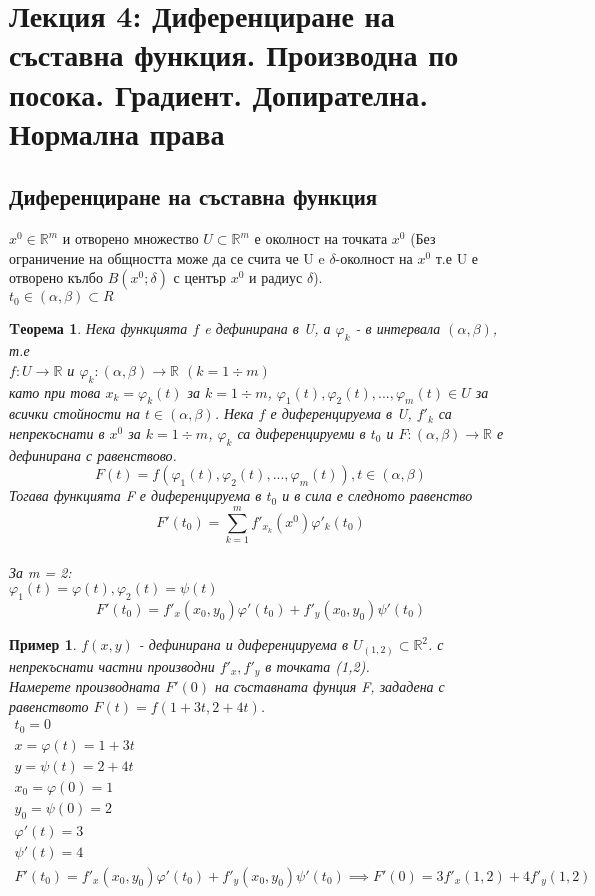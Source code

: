 \documentclass[a4paper,fleqn,12pt]{article}
\newtheorem{theorem}{Tеорема}[subsection]
\newtheorem{example}{Пример}[subsection]
\begin{document}
\newpage

\section{Лекция 4: Диференциране на съставна функция. Производна по посока. Градиент. Допирателна. Нормална права}

\subsection{Диференциране на съставна функция}
$x^0 \in \mathbb{R}^m$ и отворено множество $U \subset \mathbb{R}^m$ е околност на точката $x^0$ (Без ограничение на общността може да се счита че U e $\delta$-околност на $x^0$ т.е U е отворено кълбо $B(x^0;\delta)$ с център $x^0$ и радиус $\delta$). \\
$t_0 \in (\alpha, \beta) \subset R$

\begin{theorem}
Нека функцията $f$ e дефинирана в U, а $\varphi_k$ - в интервала $(\alpha, \beta)$, т.е \\
$f: U \to \mathbb{R}$ и $\varphi_k: (\alpha, \beta)  \to \mathbb{R} $ $ (k = 1 \div m)$\\
като при това $x_k = \varphi_k(t)$ за $ k = 1 \div m $, $ \varphi_1(t),  \varphi_2(t), ...,  \varphi_m(t) \in U$ за всички стойности на $t \in (\alpha, \beta)$. Нека $f$ е диференцируема в U, $f'_k$ са непрекъснати в $x^0$ за $ k = 1 \div m$, $\varphi_k$ са диференцируеми в $t_0$ и $F: (\alpha, \beta)  \to \mathbb{R}$ е дефинирана с равенствово. \\
$$F(t) = f(\varphi_1(t),  \varphi_2(t), ...,  \varphi_m(t)), t \in (\alpha, \beta)$$
Тогава функцията F е диференцируема в $t_0$ и в сила е следното равенство
$$F'(t_0) = \sum_{k =1}^m f'_{x_k}(x^0)\varphi '_k (t_0)$$ \\
За m = 2: \\
$\varphi_1(t) = \varphi(t) , \varphi_2(t) =\psi(t) $
$$F'(t_0) = f'_x(x_0, y_0)\varphi'(t_0) + f'_y(x_0, y_0)\psi'(t_0)$$
\end{theorem}

\begin{example}
$f(x,y)$ - дефинирана и диференцируема в $U_{(1,2)} \subset \mathbb{R}^2$. с непрекъснати частни производни $f'_x, f'_y$ в точката (1,2). \\
Намерете производната $F'(0)$ на съставната фунция F, зададена с равенството $F(t) = f(1+3t, 2+4t)$.
\begin{gather*}
t_0 = 0 \\
x = \varphi(t) = 1+3t \\
y = \psi(t) = 2 + 4t \\
x_0 = \varphi(0) = 1 \\
y_0 = \psi(0) = 2 \\
\varphi'(t) = 3 \\
\psi'(t) = 4 \\
F'(t_0) = f'_x(x_0, y_0)\varphi'(t_0) + f'_y(x_0, y_0)\psi'(t_0) \implies  F'(0) = 3f'_x(1,2) + 4f'_y(1,2)
\end{gather*}
\end{example}
\end{document}
